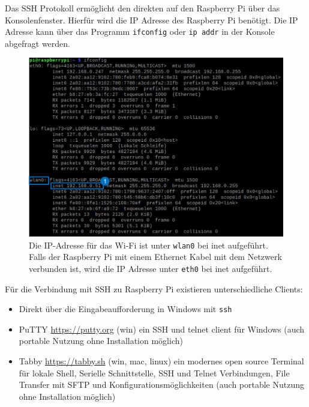 \documentclass[
  11pt,
  a4paperpaper,
  oneside, openany  ,captions=tableheading
]{scrbook}
\providecommand{\tightlist}{%
  \setlength{\itemsep}{0pt}\setlength{\parskip}{0pt}}
\theoremstyle{definition}
\theoremstyle{remark}
\begin{document}
Das SSH Protokoll ermöglicht den direkten auf den Raspberry Pi über das
Konsolenfenster. Hierfür wird die IP Adresse des Raspberry Pi benötigt.
Die IP Adresse kann über das Programm \texttt{ifconfig} oder
\texttt{ip\ addr} in der Konsole abgefragt werden.

\begin{figure}[H]

{\centering \includegraphics{images/raspberry_pi_ifconfig.png}

}

\caption{Die IP-Adresse für das Wi-Fi ist unter \texttt{wlan0} bei inet
aufgeführt. Falls der Raspberry Pi mit einem Ethernet Kabel mit dem
Netzwerk verbunden ist, wird die IP Adresse unter \texttt{eth0} bei inet
aufgeführt.}

\end{figure}%

Für die Verbindung mit SSH zu Raspberry Pi existieren unterschiedliche
Clients:

\begin{itemize}
\tightlist
\item
  Direkt über die Eingabeaufforderung in Windows mit \texttt{ssh}
\item
  PuTTY \url{https://putty.org} (win) ein SSH und telnet client für
  Windows (auch portable Nutzung ohne Installation möglich)
\item
  Tabby \url{https://tabby.sh} (win, mac, linux) ein modernes open
  source Terminal für lokale Shell, Serielle Schnittstelle, SSH und
  Telnet Verbindungen, File Transfer mit SFTP und
  Konfigurationsmöglichkeiten (auch portable Nutzung ohne Installation
  möglich)
\end{itemize}
\end{document}
